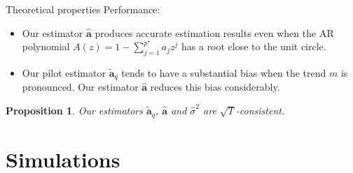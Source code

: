\documentclass[10pt, handout]{beamer}
\newtheorem{prop}{Proposition}
\begin{document}
\begin{frame}{Theoretical properties}
Performance:
\begin{itemize}
\item Our estimator $\widehat{\boldsymbol{a}}$ produces accurate estimation results even when the AR polynomial $A(z) = 1 - \sum_{j=1}^{p^\star} a_j z^j$ has a root close to the unit circle.\pause
\item Our pilot estimator $\widetilde{\boldsymbol{a}}_q$ tends to have a substantial bias when the trend $m$ is pronounced. Our estimator $\widehat{\boldsymbol{a}}$ reduces this bias considerably.\pause
\end{itemize}
\begin{prop}{}
Our estimators $\widetilde{\boldsymbol{a}}_q$, $\widehat{\boldsymbol{a}}$ and $\widehat{\sigma}^2$ are $\sqrt{T}$-consistent. 
\end{prop}
\end{frame}

\section{Simulations}
\end{document}
